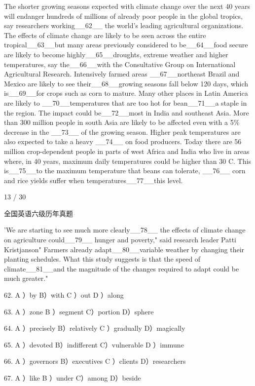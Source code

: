 \documentclass[UTF8,11pt]{ctexart}
\begin{document}
The shorter growing seasons expected with climate change over the next 40 years will endanger hundreds of millions of already poor people in the global tropics, say researchers working\_\_62\_\_ the world's leading agricultural organizations. The effects of climate change are likely to be seen across the entire tropical\_\_63\_\_but many areas previously considered to be\_\_64\_\_food secure are likely to become highly\_\_65\_\_droughts, extreme weather and higher temperatures, say the\_\_66\_\_with the Consultative Group on International Agricultural Research. Intensively farmed areas \_\_67\_\_northeast Brazil and Mexico are likely to see their\_\_68\_\_growing seasons fall below 120 days, which is\_\_69\_\_for crops such as corn to mature. Many other places in Latin America are likely to \_\_70\_\_temperatures that are too hot for bean\_\_71\_\_a staple in the region. The impact could be\_\_72\_\_most in India and southeast Asia. More than 300 million people in south Asia are likely to be affected even with a 5\% decrease in the \_\_73\_\_ of the growing season. Higher peak temperatures are also expected to take a heavy \_\_74\_\_ on food producers. Today there are 56 million crop-dependent people in parts of west Africa and India who live in areas where, in 40 years, maximum daily temperatures could be higher than 30 C. This is\_\_75\_\_to the maximum temperature that beans can tolerate, \_\_76\_\_ corn and rice yields suffer when temperatures\_\_77\_\_this level.


13 / 30


全国英语六级历年真题


'We are starting to see much more clearly\_\_78\_\_ the effects of climate change on agriculture could\_\_79\_\_ hunger and poverty," said research leader Patti Kristjanson" Farmers already adapt\_\_80\_\_variable weather by changing their planting schedules. What this study suggests is that the speed of climate\_\_81\_\_and the magnitude of the changes required to adapt could be much greater."


62. A ）by B）with C ）out D ）along


63. A ）zone B ）segment C）portion D）sphere


64. A ）precisely B）relatively C ）gradually D）magically


65. A ）devoted B）indifferent C）vulnerable D ）immune


66. A ）governors B）executives C ）clients D）researchers


67. A ）like B ）under C）among D）beside
\end{document}
